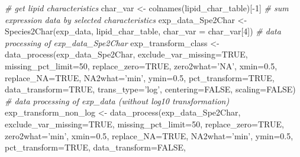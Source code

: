 \documentclass[]{article}
\newcommand{\hlnum}[1]{\textcolor[rgb]{0.816,0.125,0.439}{#1}}%
\newcommand{\hlstr}[1]{\textcolor[rgb]{0.251,0.627,0.251}{#1}}%
\newcommand{\hlcom}[1]{\textcolor[rgb]{0.502,0.502,0.502}{\textit{#1}}}%
\newcommand{\hlopt}[1]{\textcolor[rgb]{0,0,0}{#1}}%
\newcommand{\hlstd}[1]{\textcolor[rgb]{0.251,0.251,0.251}{#1}}%
\newcommand{\hlkwc}[1]{\textcolor[rgb]{0.251,0.251,0.251}{#1}}%
\newcommand{\hlkwd}[1]{\textcolor[rgb]{0.878,0.439,0.125}{#1}}%
\newenvironment{Shaded}{\begin{myshaded}}{\end{myshaded}}
\newcommand{\KeywordTok}[1]{\hlkwd{#1}}
\newcommand{\DataTypeTok}[1]{\hlkwc{#1}}
\newcommand{\DecValTok}[1]{\hlnum{#1}}
\newcommand{\FloatTok}[1]{\hlnum{#1}}
\newcommand{\StringTok}[1]{\hlstr{#1}}
\newcommand{\CommentTok}[1]{\hlcom{#1}}
\newcommand{\OtherTok}[1]{{#1}}
\newcommand{\OperatorTok}[1]{\hlopt{#1}}
\newcommand{\NormalTok}[1]{\hlstd{#1}}
\begin{document}
\begin{Shaded}
\begin{Highlighting}[]
\CommentTok{# get lipid characteristics}
\NormalTok{char_var <-}\StringTok{ }\KeywordTok{colnames}\NormalTok{(lipid_char_table)[}\OperatorTok{-}\DecValTok{1}\NormalTok{]}
\CommentTok{# sum expression data by selected characteristics}
\NormalTok{exp_data_Spe2Char <-}\StringTok{ }\KeywordTok{Species2Char}\NormalTok{(exp_data, lipid_char_table,}
                                  \DataTypeTok{char_var =}\NormalTok{ char_var[}\DecValTok{4}\NormalTok{])}
\CommentTok{# data processing of exp_data_Spe2Char}
\NormalTok{exp_transform_class <-}\StringTok{ }\KeywordTok{data_process}\NormalTok{(exp_data_Spe2Char, }
                                    \DataTypeTok{exclude_var_missing=}\OtherTok{TRUE}\NormalTok{,}
                                    \DataTypeTok{missing_pct_limit=}\DecValTok{50}\NormalTok{, }\DataTypeTok{replace_zero=}\OtherTok{TRUE}\NormalTok{,}
                                    \DataTypeTok{zero2what=}\StringTok{'NA'}\NormalTok{, }\DataTypeTok{xmin=}\FloatTok{0.5}\NormalTok{, }\DataTypeTok{replace_NA=}\OtherTok{TRUE}\NormalTok{,}
                                    \DataTypeTok{NA2what=}\StringTok{'min'}\NormalTok{, }\DataTypeTok{ymin=}\FloatTok{0.5}\NormalTok{, }
                                    \DataTypeTok{pct_transform=}\OtherTok{TRUE}\NormalTok{,}
                                    \DataTypeTok{data_transform=}\OtherTok{TRUE}\NormalTok{, }\DataTypeTok{trans_type=}\StringTok{'log'}\NormalTok{,}
                                    \DataTypeTok{centering=}\OtherTok{FALSE}\NormalTok{, }\DataTypeTok{scaling=}\OtherTok{FALSE}\NormalTok{)}
\CommentTok{# data processing of exp_data (without log10 transformation)}
\NormalTok{exp_transform_non_log <-}\StringTok{ }\KeywordTok{data_process}\NormalTok{(exp_data_Spe2Char,}
                                      \DataTypeTok{exclude_var_missing=}\OtherTok{TRUE}\NormalTok{,}
                                      \DataTypeTok{missing_pct_limit=}\DecValTok{50}\NormalTok{,}
                                      \DataTypeTok{replace_zero=}\OtherTok{TRUE}\NormalTok{,}
                                      \DataTypeTok{zero2what=}\StringTok{'min'}\NormalTok{, }\DataTypeTok{xmin=}\FloatTok{0.5}\NormalTok{,}
                                      \DataTypeTok{replace_NA=}\OtherTok{TRUE}\NormalTok{, }\DataTypeTok{NA2what=}\StringTok{'min'}\NormalTok{,}
                                      \DataTypeTok{ymin=}\FloatTok{0.5}\NormalTok{, }\DataTypeTok{pct_transform=}\OtherTok{TRUE}\NormalTok{,}
                                      \DataTypeTok{data_transform=}\OtherTok{FALSE}\NormalTok{,}

\end{Highlighting}
\end{Shaded}
\end{document}
